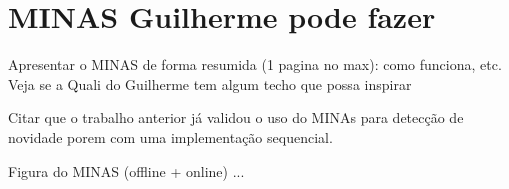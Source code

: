 \section{MINAS {\color{red} Guilherme pode fazer}}



Apresentar o MINAS de forma resumida (1 pagina no max): como funciona, etc. Veja se a Quali do Guilherme tem algum techo que possa inspirar 



Citar que o trabalho anterior já validou o uso do MINAs para detecção de novidade porem com uma implementação sequencial. 

Figura do MINAS (offline + online) ...

